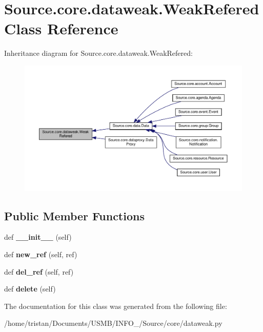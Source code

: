\hypertarget{classSource_1_1core_1_1dataweak_1_1WeakRefered}{}\section{Source.\+core.\+dataweak.\+Weak\+Refered Class Reference}
\label{classSource_1_1core_1_1dataweak_1_1WeakRefered}


Inheritance diagram for Source.\+core.\+dataweak.\+Weak\+Refered\+:\nopagebreak
\begin{figure}[H]
\begin{center}
\leavevmode
\includegraphics[width=350pt]{classSource_1_1core_1_1dataweak_1_1WeakRefered__inherit__graph}
\end{center}
\end{figure}
\subsection*{Public Member Functions}
\begin{DoxyCompactItemize}
\item 
\mbox{\label{classSource_1_1core_1_1dataweak_1_1WeakRefered_aebf83f5d2687e065920a37fc0e60bb9f}} 
def {\bfseries \+\_\+\+\_\+init\+\_\+\+\_\+} (self)
\item 
\mbox{\label{classSource_1_1core_1_1dataweak_1_1WeakRefered_a527e1d9d0a3190003d177a984fe68262}} 
def {\bfseries new\+\_\+ref} (self, ref)
\item 
\mbox{\label{classSource_1_1core_1_1dataweak_1_1WeakRefered_acc0d419f38ee8fab8be5863c5e8fdf2f}} 
def {\bfseries del\+\_\+ref} (self, ref)
\item 
\mbox{\label{classSource_1_1core_1_1dataweak_1_1WeakRefered_aa03e59708695b4b16058fb4d9c568917}} 
def {\bfseries delete} (self)
\end{DoxyCompactItemize}


The documentation for this class was generated from the following file\+:\begin{DoxyCompactItemize}
\item 
/home/tristan/\+Documents/\+U\+S\+M\+B/\+I\+N\+F\+O\+\_/\+Source/core/dataweak.\+py\end{DoxyCompactItemize}
